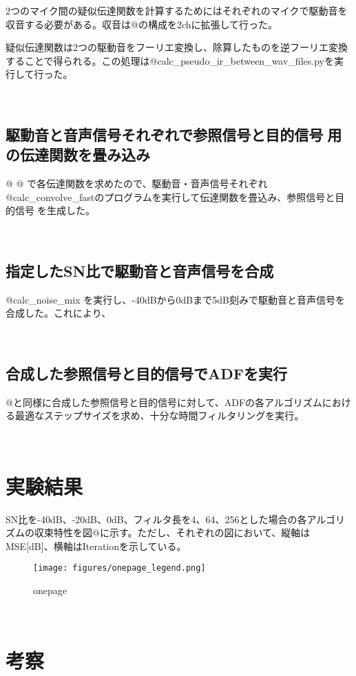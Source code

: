 2つのマイク間の疑似伝達関数を計算するためにはそれぞれのマイクで駆動音を収音する必要がある。収音は@の構成を2chに拡張して行った。

疑似伝達関数は2つの駆動音をフーリエ変換し、除算したものを逆フーリエ変換することで得られる。この処理は@calc\_pseudo\_ir\_between\_wav\_files.pyを実行して行った。

\
\subsection{駆動音と音声信号それぞれで参照信号と目的信号用の伝達関数を畳み込み}\label{convolve-each}

@ @
で各伝達関数を求めたので、駆動音・音声信号それぞれ@calc\_convolve\_fastのプログラムを実行して伝達関数を畳込み、参照信号と目的信号を生成した。

\
\subsection{指定したSN比で駆動音と音声信号を合成}\label{mix-snr}

@calc\_noise\_mix
を実行し、-40dBから0dBまで5dB刻みで駆動音と音声信号を合成した。これにより、

\
\subsection{合成した参照信号と目的信号でADFを実行}\label{exec-adf}

@と同様に合成した参照信号と目的信号に対して、ADFの各アルゴリズムにおける最適なステップサイズを求め、十分な時間フィルタリングを実行。

\
\section{実験結果}\label{result-practice}

SN比を-40dB、-20dB、0dB、フィルタ長を4、64、256とした場合の各アルゴリズムの収束特性を図@に示す。ただし、それぞれの図において、縦軸はMSE{[}dB{]}、横軸はIterationを示している。

\begin{figure}[H]
\centering
\texttt{[image: figures/onepage\_legend.png]}
\caption{onepage}
\end{figure}

\
\section{考察}\label{consideration-practice}

